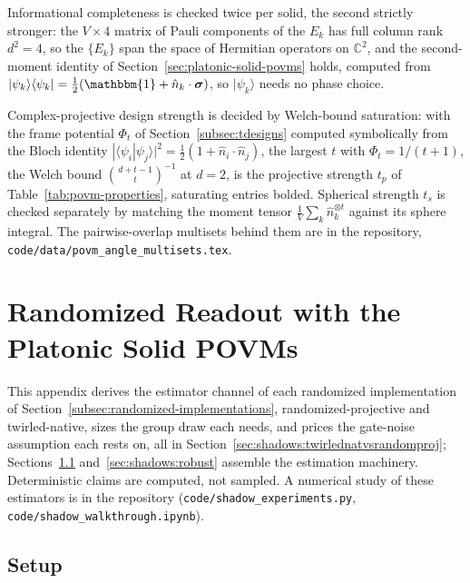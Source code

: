 \documentclass[11pt, oneside, openany]{scrbook}
\newcommand{\C}{\mathbb{C}}
\newcommand{\Id}{\mathbbm{1}}
\newcommand{\sigmavec}{\boldsymbol{\sigma}}
\newcommand{\ket}[1]{|#1\rangle}
\newcommand{\braket}[2]{\langle#1|#2\rangle}
\newcommand{\ketbra}[2]{|#1\rangle\langle#2|}
\begin{document}
Informational completeness is checked twice per solid, the second strictly stronger: the $V \times 4$ matrix of Pauli components of the $E_k$ has full column rank $d^2 = 4$, so the $\{E_k\}$ span the space of Hermitian operators on $\C^2$, and the second-moment identity of Section~\ref{sec:platonic-solid-povms} holds, computed from $\ketbra{\psi_k}{\psi_k} = \tfrac{1}{2}(\Id + \hat n_k \cdot \sigmavec)$, so $\ket{\psi_k}$ needs no phase choice.\label{sec:povm-atlas:ic}

Complex-projective design strength is decided by Welch-bound saturation: with the frame potential $\Phi_t$ of Section~\ref{subsec:tdesigns} computed symbolically from the Bloch identity $|\braket{\psi_i}{\psi_j}|^2 = \tfrac{1}{2}(1 + \hat n_i \cdot \hat n_j)$, the largest $t$ with $\Phi_t = 1/(t+1)$, the Welch bound $\binom{d+t-1}{t}^{-1}$ at $d = 2$, is the projective strength $t_p$ of Table~\ref{tab:povm-properties}, saturating entries bolded. Spherical strength $t_s$ is checked separately by matching the moment tensor $\frac{1}{V}\sum_k \hat n_k^{\otimes t}$ against its sphere integral. The pairwise-overlap multisets behind them are in the repository, \texttt{code/data/povm\_angle\_multisets.tex}.



\chapter{Randomized Readout with the Platonic Solid POVMs} \label{app:shadows}

This appendix derives the estimator channel of each randomized implementation of Section~\ref{subsec:randomized-implementations}, randomized-projective and twirled-native, sizes the group draw each needs, and prices the gate-noise assumption each rests on, all in Section~\ref{sec:shadows:twirlednatvsrandomproj}; Sections~\ref{sec:shadows:setup} and~\ref{sec:shadows:robust} assemble the estimation machinery. Deterministic claims are computed, not sampled. A numerical study of these estimators is in the repository (\texttt{code/shadow\_experiments.py}, \texttt{code/shadow\_walkthrough.ipynb}). %

\section{Setup} \label{sec:shadows:setup}
\end{document}
